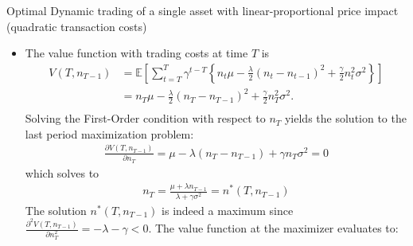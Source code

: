 \documentclass[10pt]{article}
\newcommand{\Ebb}{\mathbb{E}}
\newenvironment{exercise}[2][Exercise]{\begin{trivlist}
  \item[\hskip \labelsep {\bfseries #1}\hskip \labelsep {\bfseries #2.}]}{\end{trivlist}}
\begin{document}
\begin{exercise}{3}{Optimal Dynamic trading of a single asset with linear-proportional price impact (quadratic transaction costs)}

  \begin{itemize}
    \item
    The value function with trading costs at time $T$ is
    \begin{align*}
      V(T, n_{T - 1}) &= \Ebb\left[ \sum_{t = T}^T \gamma^{t - T}\left\{ n_t\mu -
      \frac \lambda 2 \left( n_t - n_{t - 1} \right)^2 + \frac \gamma 2
      n_t^2\sigma^2 \right\} \right]  \\
      &= n_T\mu -
      \frac \lambda 2 \left( n_T - n_{T - 1} \right)^2 + \frac \gamma 2
      n_T^2\sigma^2.  \\
    \end{align*}
  Solving the First-Order condition with respect to $n_{T}$ yields the solution
  to the last period maximization problem:
  \begin{align*}
    \frac{\partial V(T, n_{T - 1})}{\partial n_T} = \mu - \lambda (n_T -
    n_{T-1}) + \gamma n_T \sigma^2 = 0
  \end{align*}
  which solves to
  \begin{align*}
    n_T = \frac{\mu + \lambda n_{T-1}}{\lambda + \gamma \sigma^2} = n^*(T, n_{T
    - 1})
  \end{align*}
  The solution $n^*(T, n_{T-1})$ is indeed a maximum since $\frac{\partial^2 V(T,
    n_{T-1})}{\partial n_T^2} = -\lambda - \gamma < 0$. The value function at
  the maximizer evaluates to:


\end{itemize}
\end{exercise}
\end{document}
